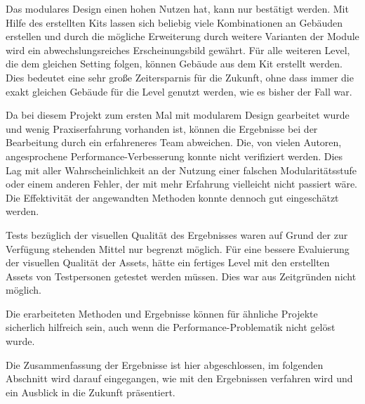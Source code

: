 \par
Das modulares Design einen hohen Nutzen hat, kann nur bestätigt werden. Mit Hilfe des erstellten Kits lassen sich beliebig viele Kombinationen an Gebäuden erstellen und durch die mögliche Erweiterung durch weitere Varianten der Module wird ein abwechslungsreiches Erscheinungsbild gewährt. Für alle weiteren Level, die dem gleichen Setting folgen, können Gebäude aus dem Kit erstellt werden. Dies bedeutet eine sehr große Zeitersparnis für die Zukunft, ohne dass immer die exakt gleichen Gebäude für die Level genutzt werden, wie es bisher der Fall war.
\par
Da bei diesem Projekt zum ersten Mal mit modularem Design gearbeitet wurde und wenig Praxiserfahrung vorhanden ist, können die Ergebnisse bei der Bearbeitung durch ein erfahreneres Team abweichen. Die, von vielen Autoren, angesprochene Performance-Verbesserung konnte nicht verifiziert werden. Dies Lag mit aller Wahrscheinlichkeit an der Nutzung einer falschen Modularitätsstufe oder einem anderen Fehler, der mit mehr Erfahrung vielleicht nicht passiert wäre. Die Effektivität der angewandten Methoden konnte dennoch gut eingeschätzt werden. 
\par
Tests bezüglich der visuellen Qualität des Ergebnisses waren auf Grund der zur Verfügung stehenden Mittel nur begrenzt möglich. Für eine bessere Evaluierung der visuellen  Qualität der Assets, hätte ein fertiges Level  mit den erstellten Assets von Testpersonen getestet werden müssen. Dies war aus Zeitgründen nicht möglich. 
\par
Die erarbeiteten Methoden und Ergebnisse können für ähnliche Projekte sicherlich hilfreich sein, auch wenn die Performance-Problematik nicht gelöst wurde.
\par
Die Zusammenfassung der Ergebnisse ist hier abgeschlossen, im folgenden Abschnitt wird darauf eingegangen, wie mit den Ergebnissen verfahren wird und ein Ausblick in die Zukunft präsentiert.
